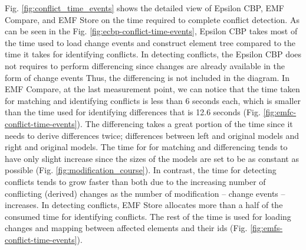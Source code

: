Fig. \ref{fig:conflict_time_events} shows the detailed view of Epsilon CBP, EMF Compare, and EMF Store on the time required to complete conflict detection. As can be seen in the Fig. \ref{fig:ecbp-conflict-time-events}, Epsilon CBP takes most of the time used to load change events and construct element tree compared to the time it takes for identifying conflicts. In detecting conflicts, the Epsilon CBP does not requires to perform differencing since changes are already available in the form of change events Thus, the differencing is not included in the diagram. In EMF Compare, at the last measurement point, we can notice that the time taken for matching and identifying conflicts is less than 6 seconds each, which is smaller than the time used for identifying differences that is 12.6 seconds (Fig. \ref{fig:emfc-conflict-time-events}). The differencing takes a great portion of the time since it needs to derive differences twice; differences between left and original models and right and original models. The time for for matching and differencing tends to have only slight increase since the sizes of the models are set to be as constant as possible (Fig. \ref{fig:modification_course}). In contrast, the time for detecting conflicts tends to grow faster than both due to the increasing number of conflicting (derived) changes as the number of modification -- change events -- increases. In detecting conflicts, EMF Store allocates more than a half of the consumed time for identifying conflicts. The rest of the time is used for loading changes and mapping between affected elements and their ids (Fig. \ref{fig:emfs-conflict-time-events}). 

